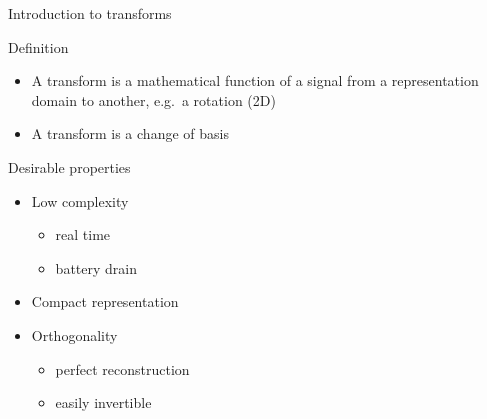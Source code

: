 \documentclass[10pt]{beamer} %
\begin{document}
\begin{frame}{Introduction to transforms}
	\begin{block}{Definition}
		\begin{itemize}
			\item A transform is a mathematical function of a signal from a
				representation domain to another, e.g.\ a rotation (2D)
			\item A transform is a change of basis
		\end{itemize}
	\end{block}
	\begin{minipage}{0.40\textwidth}
		\begin{block}{Desirable properties}
			\begin{itemize}
				\item Low complexity
					\begin{itemize}
						\item real time
						\item battery drain
					\end{itemize}
				\item Compact representation
				\item Orthogonality
					\begin{itemize}
						\item perfect reconstruction
						\item easily invertible
					\end{itemize}
			\end{itemize}
		\end{block}
	\end{minipage}
	\hfill
	\begin{minipage}{0.58\textwidth}
		\vspace{2em}
		
	\end{minipage}
\end{frame}
\end{document}

